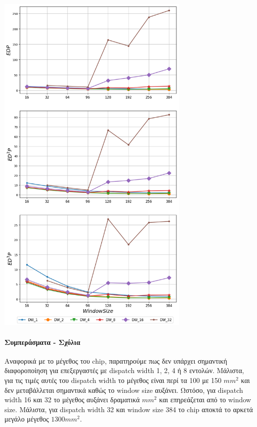    \begin{minipage}{\textwidth}
      \begin{center}
         \\
         \vspace{3mm}
         \includegraphics[width=0.7\textwidth]{./graphs/edp/GemsFDTD.png}
         \vspace{6mm}
      \end{center}
   \end{minipage}



   \paragraph{Συμπεράσματα - Σχόλια}
   Αναφορικά με το μέγεθος του chip, παρατηρούμε πως δεν υπάρχει σημαντική
   διαφοροποίηση για επεξεργαστές με dispatch width 1, 2, 4 ή 8 εντολών.
   Μάλιστα, για τις τιμές αυτές του dispatch width το μέγεθος είναι περί τα 100
   με 150 $mm^2$ και δεν μεταβάλλεται σημαντικά καθώς το window size αυξάνει.
   Ωστόσο, για dispatch width 16 και 32 το μέγεθος αυξάνει δραματικά $mm^2$ και
   επηρεάζεται από το window size. Μάλιστα, για dispatch width 32 και window
   size 384 το chip αποκτά το αρκετά μεγάλο μέγεθος $1300 mm^2$.

